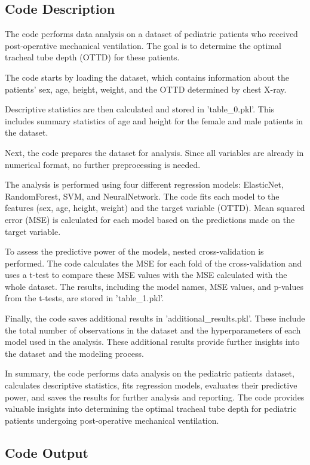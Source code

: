 \documentclass[11pt]{article}
\begin{document}
\subsection{Code Description}

The code performs data analysis on a dataset of pediatric patients who received post-operative mechanical ventilation. The goal is to determine the optimal tracheal tube depth (OTTD) for these patients.

The code starts by loading the dataset, which contains information about the patients' sex, age, height, weight, and the OTTD determined by chest X-ray.

Descriptive statistics are then calculated and stored in 'table\_0.pkl'. This includes summary statistics of age and height for the female and male patients in the dataset.

Next, the code prepares the dataset for analysis. Since all variables are already in numerical format, no further preprocessing is needed.

The analysis is performed using four different regression models: ElasticNet, RandomForest, SVM, and NeuralNetwork. The code fits each model to the features (sex, age, height, weight) and the target variable (OTTD). Mean squared error (MSE) is calculated for each model based on the predictions made on the target variable.

To assess the predictive power of the models, nested cross-validation is performed. The code calculates the MSE for each fold of the cross-validation and uses a t-test to compare these MSE values with the MSE calculated with the whole dataset. The results, including the model names, MSE values, and p-values from the t-tests, are stored in 'table\_1.pkl'.

Finally, the code saves additional results in 'additional\_results.pkl'. These include the total number of observations in the dataset and the hyperparameters of each model used in the analysis. These additional results provide further insights into the dataset and the modeling process.

In summary, the code performs data analysis on the pediatric patients dataset, calculates descriptive statistics, fits regression models, evaluates their predictive power, and saves the results for further analysis and reporting. The code provides valuable insights into determining the optimal tracheal tube depth for pediatric patients undergoing post-operative mechanical ventilation.

\subsection{Code Output}
\end{document}
